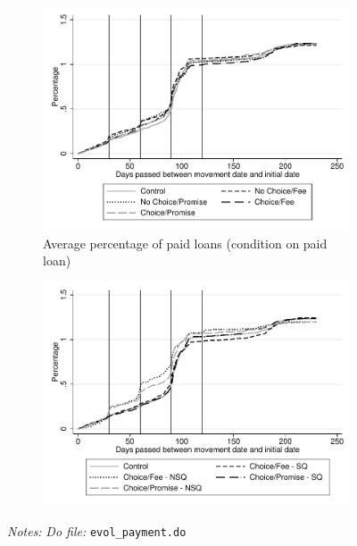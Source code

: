 \documentclass[11pt]{article}
\begin{document}
\begin{figure}[H]
\begin{center}
    \begin{subfigure}{0.49\textwidth}
        \caption{Average percentage of paid loans (condition on paid loan)}
        \centering
        \includegraphics[width=\textwidth]{Figuras/sum_porc_cond_evol.pdf}
    \end{subfigure}
     \begin{subfigure}{0.49\textwidth}
      \caption*{}
        \centering
        \includegraphics[width=\textwidth]{Figuras/sum_porc_cond_evol_choice.pdf}
    \end{subfigure}
    \end{center}
     \footnotesize \textit{Notes: } 
      \footnotesize{ \textit{Do file: }  \texttt{evol\_payment.do}}
\end{figure}
\end{document}
